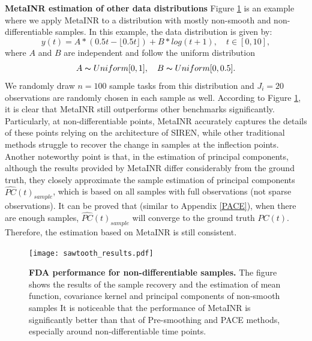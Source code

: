 \documentclass{article}
\begin{document}
\textbf{MetaINR estimation of other data distributions}
Figure \ref{sawtooth_results} is an example where we apply MetaINR to a distribution with mostly non-smooth and non-differentiable samples. 
In this example, the data distribution is given by:
$$
y(t)=A *(0.5t-\lfloor 0.5t \rfloor) + B*log(t+1), \quad t \in [0,10],
$$
where $A$ and $B$ are independent and follow the uniform distribution
$$
A \thicksim Uniform[0,1], \quad B \thicksim Uniform[0,0.5].
$$
We randomly draw $n=100$ sample tasks from this distribution and $J_i=20$ observations are randomly chosen in each sample as well.
According to Figure \ref{sawtooth_results}, it is clear that MetaINR still outperforms other benchmarks significantly. 
Particularly, at non-differentiable points, MetaINR accurately captures the details of these points relying on the architecture of SIREN, 
while other traditional methods struggle to recover the change in samples at the inflection points.
Another noteworthy point is that, in the estimation of principal components, 
although the results provided by MetaINR differ considerably from the ground truth, 
they closely approximate the sample estimation of principal components $\widehat{PC}(t)_{sample}$, which is based on all samples with full observations (not sparse observations).
It can be proved that (similar to Appendix \ref{PACE}), when there are enough samples, $\widehat{PC}(t)_{sample}$ will converge to the ground truth $PC(t)$. 
Therefore, the estimation based on MetaINR is still consistent.
\begin{figure}[htb]
  \centering
  \texttt{[image: sawtooth\_results.pdf]}
  \caption{\textbf{FDA performance for non-differentiable samples.} The figure shows the results of the sample recovery and the estimation of mean function, covariance kernel and principal components of non-smooth samples
  It is noticeable that the performance of MetaINR is significantly better than that of Pre-smoothing and PACE methods, especially around non-differentiable time points. }
  \label{sawtooth_results}
\end{figure}
\end{document}
